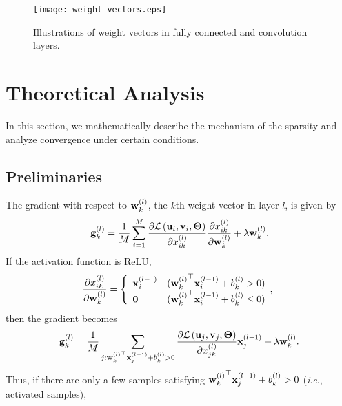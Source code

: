 \documentclass[conference]{IEEEtran}
\newcommand{\ie}{\textit{i}.\textit{e}.}
\begin{document}
\begin{figure}[tb] 
	\centerline{\texttt{[image: weight\_vectors.eps]}}
	\caption{Illustrations of weight vectors in fully connected and convolution layers.}
	\label{fig:weight_vectors}
\end{figure}

\section{Theoretical Analysis}\label{sec:theoretical_analysis}
In this section, we mathematically describe the mechanism of the sparsity and analyze convergence under certain conditions.

\subsection{Preliminaries}\label{subsec:preliminaries}
The gradient with respect to ${\bf w}_k^{\left( l \right)}$, the $k$th weight vector in layer $l$, is given by
\begin{align}{\bf g}_k^{\left( l \right)} 
	= \frac{1}{M} \sum_{i=1}^M
	\frac{\partial {\mathcal L} \left( {\bf u}_i, {\bf v}_i , {\bf \Theta} \right)}
	{\partial x_{ik}^{\left( l\right)}}
	\frac{\partial x_{ik}^{\left( l\right)}}
	{\partial {\bf w}_k^{\left( l \right)}}
	+ \lambda {\bf w}_k^{\left( l \right)}.
\end{align}
If the activation function is ReLU, 
\begin{align}
	\frac{\partial x_{ik}^{\left( l\right)}}
	{\partial {\bf w}_k^{\left( l \right)}}
	=
	\left \{
		\begin{array}{ll}
		{\bf x}_i^{\left( l-1 \right)}	&	({{\bf w}_k^{\left( l \right)}}^\top {\bf x}_i^{\left( l-1 \right)} + b_k^{\left( l \right) } > 0) \\
		{\bf 0}							&	({{\bf w}_k^{\left( l \right)}}^\top {\bf x}_i^{\left( l-1 \right)} + b_k^{\left( l \right) } \leq 0)
		\end{array},
	\right.	
\end{align}
then the gradient becomes
\begin{align}{\bf g}_k^{\left( l \right)} 
	= \frac{1}{M} \sum_{ j:{{\bf w}_k^{\left( l \right)}}^\top {\bf x}_j^{\left( l-1 \right)} + b_k^{\left( l \right) } > 0 }
	\frac{\partial {\mathcal L} \left( {\bf u}_j, {\bf v}_j , {\bf \Theta} \right)}
	{\partial x_{jk}^{\left( l\right)}}
	{\bf x}_j^{\left( l-1 \right)} + \lambda {\bf w}_k^{\left( l \right)}.
\end{align}
Thus, if there are only a few samples satisfying ${{\bf w}_k^{\left( l \right)}}^\top {\bf x}_j^{\left( l-1 \right)} + b_k^{\left( l \right) } > 0$ (\ie, activated samples), 
\end{document}

